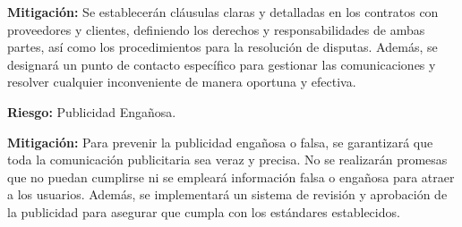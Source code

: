 \textbf{Mitigación:} Se establecerán cláusulas claras y detalladas en los contratos con proveedores y clientes, definiendo los derechos y responsabilidades de ambas partes, así como los procedimientos para la resolución de disputas. Además, se designará un punto de contacto específico para gestionar las comunicaciones y resolver cualquier inconveniente de manera oportuna y efectiva.

\textbf{Riesgo:} Publicidad Engañosa.


\textbf{Mitigación:} Para prevenir la publicidad engañosa o falsa, se garantizará que toda la comunicación publicitaria sea veraz y precisa. No se realizarán promesas que no puedan cumplirse ni se empleará información falsa o engañosa para atraer a los usuarios. Además, se implementará un sistema de revisión y aprobación de la publicidad para asegurar que cumpla con los estándares establecidos.